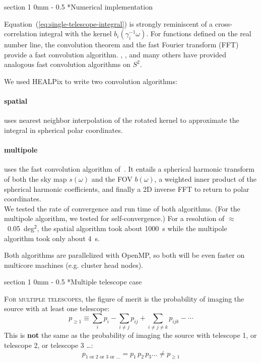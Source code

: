 \documentclass[portrait]{a0poster}
\makeatletter
\renewcommand{\section}{\@startsection
{section}%
{1}%
{0mm}%
{-\baselineskip}%
{0.5\baselineskip}%
{\fontspec{Marvel Bold}\Huge}} %
\makeatother
\begin{document}
\section*{Numerical implementation}

Equation~(\ref{eq:single-telescope-integral}) is strongly reminiscent of a cross-correlation integral with the kernel $b_i (\gamma_i^{-1} \omega)$.  For functions defined on the real number line, the convolution theorem and the fast Fourier transform (FFT) provide a fast convolution algorithm.  \citet{Driscoll1994202}, \citet{Wandelt:2001p13439}, and many others have provided analogous fast convolution algorithms on $S^2$.

We used HEALPix to write two convolution algorithms:

\paragraph{spatial} uses nearest neighbor interpolation of the rotated kernel to approximate the integral in spherical polar coordinates.

\paragraph{multipole} uses the fast convolution algorithm of~\citet{Wandelt:2001p13439}.  It entails a spherical harmonic transform of both the sky map $s(\omega)$ and the FOV $b(\omega)$, a weighted inner product of the spherical harmonic coefficients, and finally a 2D inverse FFT to return to polar coordinates.\\

We tested the rate of convergence and run time of both algorithms.  (For the multipole algorithm, we tested for self-convergence.)  For a resolution of $\approx$~0.05~deg$^\mathsf{2}$, the spatial algorithm took about 1000~s while the multipole algorithm took only about 4~s.

Both algorithms are parallelized with OpenMP, so both will be even faster on multicore machines (e.g. cluster head nodes).

\section*{Multiple telescope case}

\lettrine{F}{or multiple telescopes}, the figure of merit is the probability of imaging the source with at least one telescope:
$$
	p_{\geqslant 1} \equiv \sum_i p_i - \sum_{i \neq j} p_{ij} + \sum_{i \neq j \neq k} p_{ijk} - \cdots
$$
This is \textbf{not} the same as the probability of imaging the source with telescope 1, or telescope 2, or telescope 3 \dots :
$$
	p_{1 \textrm{ or } 2 \textrm{ or } 3 \textrm{ or } \dots} = p_1 \, p_2 \, p_3 \dots \neq p_{\geqslant 1}
$$
\end{document}
